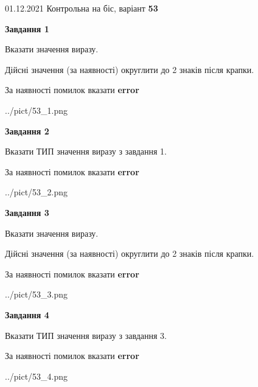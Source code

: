 \documentclass[11pt, ukrainian]{article}
\begin{document}
{01.12.2021 Контрольна на біс, варіант  \No \textbf { 53 }\par}
{
\begin {large}
{\begin {center}\textbf{Завдання 1}\end {center}}\par
Вказати значення виразу. \par
Дійсні значення (за наявності) округлити до 2 знаків після крапки. \par
За наявності помилок вказати \textbf{error}

\begin{center}
	{../pict/53_1.png}
\end{center}
\newpage

{\begin {center}\textbf{Завдання 2}\end {center}}\par
Вказати ТИП значення виразу з завдання 1. \par
За наявності помилок вказати \textbf{error}

\begin{center}
	{../pict/53_2.png}
\end{center}
\newpage

{\begin {center}\textbf{Завдання 3}\end {center}}\par
Вказати значення виразу. \par
Дійсні значення (за наявності) округлити до 2 знаків після крапки. \par
За наявності помилок вказати \textbf{error}

\begin{center}
	{../pict/53_3.png}
\end{center}
\newpage

{\begin {center}\textbf{Завдання 4}\end {center}}\par
Вказати ТИП значення виразу з завдання 3. \par
За наявності помилок вказати \textbf{error}

\begin{center}
	{../pict/53_4.png}
\end{center}
\newpage


\end{large}}
\end{document}
